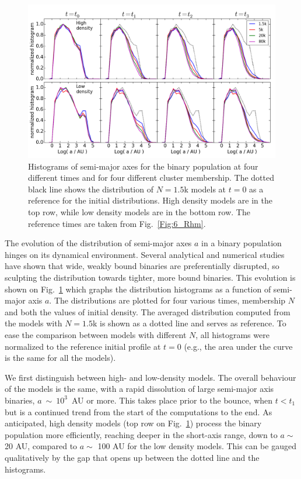 \begin{figure}
\begin{center}
\includegraphics[width=\textwidth]{Figures/6_SMAxis_histogram}
\caption{Histograms of semi-major axes for the binary population at four different times and for four different cluster membership. The dotted black line shows the distribution of $N = 1.5$k models at $t=0$ as a reference for the initial distributions. High density models are in the top row, while low density models are in the bottom row. The reference times are taken from Fig.~\ref{Fig:6_Rhm}.}
\label{Fig:6_SMAxis_histogram}
\end{center}
\end{figure}

The evolution of the distribution of semi-major axes $a $ %
in a binary population hinges on its dynamical environment. Several analytical and numerical studies
\citep{Heggie1975,Kroupa1995,Kroupa1995a,Heggie2006,Parker2009,Parker2011} have shown that wide, weakly bound binaries are preferentially disrupted, so sculpting the distribution towards tighter, more bound binaries. 
This evolution is shown on Fig.~\ref{Fig:6_SMAxis_histogram} which graphs the distribution histograms as a function of semi-major axis $a$. The distributions are plotted for four various times, membership $N$ and both the values of initial density. The averaged distribution computed from the models with $N = 1.5$k is shown as a dotted line and serves as reference. To ease the comparison between models with different $N$, all histograms were normalized to the reference initial profile at $t=0$ (e.g., the area under the curve is the same for all the models).


We first distinguish between high- and low-density models. The overall behaviour of the models is the same, with a rapid dissolution of large semi-major axis binaries,
$a~\sim~10^3$~AU or more. This takes place prior to the bounce, when $t < t_1$ but is a continued trend from the start of the computations to the end.
As anticipated, high density models (top row on Fig.~\ref{Fig:6_SMAxis_histogram}) process the binary population more efficiently, reaching deeper in the short-axis
range, down to  $a \sim$ 20 AU, compared to $a \sim$ 100 AU for the low density models.
This can be gauged qualitatively by the gap that opens up between the dotted line and the histograms.

